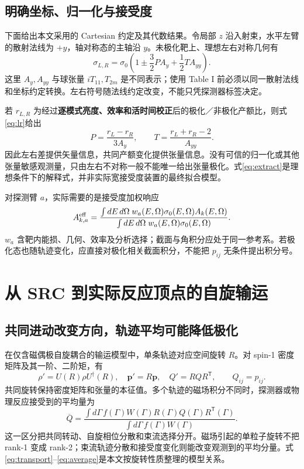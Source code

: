 \documentclass[UTF8,11pt,a4paper,fontset=none]{ctexart}
\begin{document}
\subsection{明确坐标、归一化与接受度}
下面给出本文采用的 Cartesian 约定及其代数结果。令局部 $z$ 沿入射束，水平左臂的散射法线为 $+y$，轴对称态的主轴沿 $y$。未极化靶上、理想左右对称几何有
\begin{equation}
\sigma_{L,R}=\sigma_0\left(1\pm\frac32 P A_y+\frac12 T A_{yy}\right).\label{eq:lr}
\end{equation}
这里 $A_y,A_{yy}$ 与球张量 $iT_{11},T_{2m}$ 是不同表示；使用 Table I 前必须以同一散射法线和坐标约定转换。左右符号随法线约定改变，不能只凭探测器标签决定。

若 $r_{L,R}$ 为经过\textbf{逐模式亮度、效率和活时间校正}后的极化／非极化产额比，则式\eqref{eq:lr}给出
\begin{equation}
P=\frac{r_L-r_R}{3A_y},\qquad T=\frac{r_L+r_R-2}{A_{yy}}.\label{eq:extract}
\end{equation}
因此左右差提供矢量信息，共同产额变化提供张量信息。没有可信的归一化或其他张量敏感观测量，只由左右不对称一般不能唯一给出张量极化。式\eqref{eq:extract}是理想条件下的解释式，并非实际宽接受度装置的最终拟合模型。

对探测臂 $a$，实际需要的是接受度加权响应
\begin{equation}
A^{\rm eff}_{k,a}=\frac{\int dE\,d\Omega\;w_a(E,\Omega)\sigma_0(E,\Omega)A_k(E,\Omega)}
{\int dE\,d\Omega\;w_a(E,\Omega)\sigma_0(E,\Omega)}.\label{eq:aeff}
\end{equation}
$w_a$ 含靶内能损、几何、效率及分析选择；截面与角积分应处于同一参考系。若极化态也随轨迹变化，应直接对极化相关截面积分，不能把 $p_{ij}$ 无条件提出积分号。

\clearpage
\section{从 SRC 到实际反应顶点的自旋输运}

\subsection{共同进动改变方向，轨迹平均可能降低极化}
在仅含磁偶极自旋耦合的输运模型中，单条轨迹对应空间旋转 $R$。对 spin-1 密度矩阵及其一阶、二阶矩，有
\begin{equation}
\rho'=U(R)\rho U^\dagger(R),\quad
\bm p'=R\bm p,\quad Q'=RQR^{\mathsf T},\qquad Q_{ij}=p_{ij}.\label{eq:transport}
\end{equation}
共同旋转保持密度矩阵和张量的本征值。多个轨迹的磁场积分不同时，探测器或物理反应接受到的平均量为
\begin{equation}
\overline Q=\frac{\int d\Gamma\, f(\Gamma)W(\Gamma)
R(\Gamma)Q(\Gamma)R^{\mathsf T}(\Gamma)}{\int d\Gamma\,f(\Gamma)W(\Gamma)}.\label{eq:average}
\end{equation}
这一区分把共同转动、自旋相位分散和束流选择分开。磁场引起的单粒子旋转不把 rank-1 变成 rank-2；束流轨迹分散和接受度变化则能改变观测到的平均分量。式\eqref{eq:transport}--\eqref{eq:average}是本文按旋转性质整理的模型关系。
\end{document}

